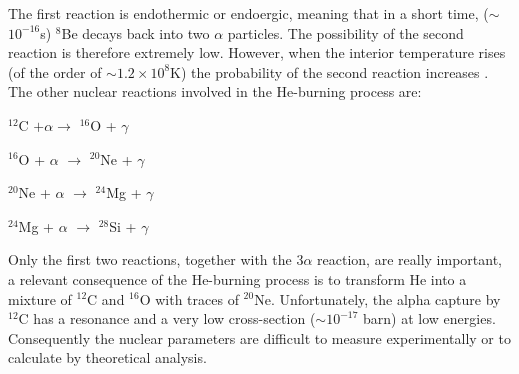 The first reaction is endothermic or endoergic, meaning that in a short time, ($\sim$ $10^{-16}$s) $^{8}$Be decays back into two $\alpha$ particles. The possibility of the second reaction is therefore extremely low. However, when the interior temperature rises (of the order of $\sim 1.2\times10^{8}$K) the probability of the second reaction increases \citep{2010ApJ...718..357T,2011PhLB..695..324D,2017APh....87...40A,2019APh...105...13H}. The other nuclear reactions involved in the He-burning process are:

\vspace{2mm}
$^{12}$C $+ \alpha \longrightarrow$ $^{16}$O + $\gamma$

$^{16}$O + $\alpha$ $\longrightarrow$ $^{20}$Ne + $\gamma$

$^{20}$Ne + $\alpha$ $\longrightarrow$ $^{24}$Mg + $\gamma$

$^{24}$Mg + $\alpha$ $\longrightarrow$ $^{28}$Si + $\gamma$
\vspace{2mm}

Only the first two reactions, together with the $3\alpha$ reaction, are really important, a relevant consequence of the He-burning process is to transform He into a mixture of $^{12}$C and $^{16}$O with traces of $^{20}$Ne. Unfortunately, the alpha capture by $^{12}$C has a resonance and a very low cross-section ($\sim 10^{-17}$ barn) at low energies. Consequently the nuclear parameters are difficult to measure experimentally or to calculate by theoretical analysis.


